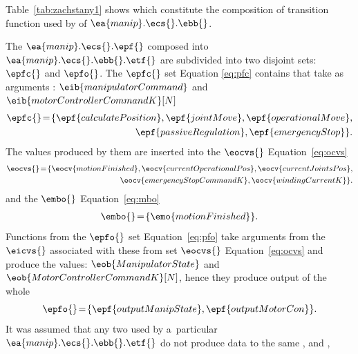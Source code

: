 \documentclass[11pt,oneside,a4paper]{article}
\newcommand{\Table}[0]{Table}
\begin{document}
	\Table{}~\ref{tab:zachstany1} shows which \PrimitiveTransitionFunctions{} constitute the composition of transition function used by \BasicBehaviours{} of $\ea{manip}.\ecs{}.\ebb{}$.
	
	The \PrimitiveTransitionFunctions{} $\ea{manip}.\ecs{}.\epf{}$ composed into \PrimitiveTransitionFunction{} $\ea{manip}.\ecs{}.\ebb{}.\etf{}$ are subdivided into two disjoint sets: $\epfc{}$ and $\epfo{}$. The $\epfc{}$ set Equation \eqref{eq:pfc}
	contains \PrimitiveTransitionFunctions{} that take as arguments \InputBuffers{}: $\eib{manipulatorCommand}$ and\\ $\eib{motorControllerCommandK}[N]$
	\begin{equation}
	\begin{split}
	\epfc{}\!=\!\{\epf{calculatePosition}, \epf{jointMove}, \epf{operationalMove}, \\ \epf{passiveRegulation}, \epf{emergencyStop}\}.
	\end{split}
	\label{eq:pfc}
	\end{equation}
	The values produced
	by them are inserted into the \TransitionFunctionCompositionVariables{} $\eocvs{}$ Equation~\eqref{eq:ocvs}
	\begin{equation}
	\begin{split}
	\eocvs{}\!=\!\{\eocv{motionFinished}, \eocv{currentOperationalPos}, \eocv{currentJointsPos}, \\ \eocv{emergencyStopCommandK}, \eocv{windingCurrentK}\}.
	\end{split}
	\label{eq:ocvs}
	\end{equation}
	and the \InternalMemory{} $\embo{}$ Equation~\eqref{eq:mbo}
	\begin{equation}
		\begin{split}
			\embo{}\!=\!\{\emo{motionFinished}\}.
		\end{split}
		\label{eq:mbo}
	\end{equation}
	Functions from the $\epfo{}$ set Equation~\eqref{eq:pfo} take arguments from the \TransitionFunctionCompositionVariables{} $\eicvs{}$ associated with these  from set $\eocvs{}$ Equation~\eqref{eq:ocvs} and produce the \OutputBuffer{} values:
	$\eob{ManipulatorState}$ and $\eob{MotorControllerCommandK}[N]$, hence they produce output of the whole \Subsystem{}
	\begin{equation}
	\epfo{}\!=\!\{\epf{outputManipState}, \epf{outputMotorCon}\}.
	\label{eq:pfo}
	\end{equation}
	It was assumed that any two \PrimitiveTransitionFunctions{} used by a~particular \PrimitiveTransitionFunction{} $\ea{manip}.\ecs{}.\ebb{}.\etf{}$ do not produce data to the same \TransitionFunctionCompositionVariables{}, \InternalMemories{} and \OutputBuffers{},
\end{document}

